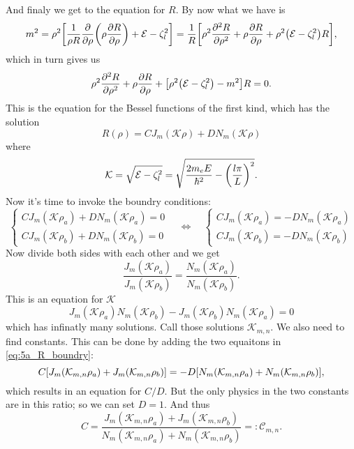 \documentclass[11pt,letter, swedish, english
]{article}
\begin{document}
And finaly we get to the equation for $R$. By now what we have is
\begin{equation}
m^2=\rho^2\qty[\frac{1}{\rho R}\pdv{\rho}
\qty(\rho\pdv{R}{\rho})+\mathcal{E}-\zeta_l^2]
=\frac{1}{R}\qty[\rho^2\pdv[2]{R}{\rho}
+\rho\pdv{R}{\rho}+\rho^2\qty(\mathcal{E}-\zeta_l^2)R],
\end{equation}
which in turn gives us
\begin{equation}\label{eq:5a_Bessel}
\rho^2\pdv[2]{R}{\rho}
+\rho\pdv{R}{\rho}+\qty[\rho^2\qty(\mathcal{E}-\zeta_l^2)-m^2]R=0.
\end{equation}
This is the equation for the Bessel functions of the first kind, which
has the solution
\begin{equation}
R(\rho)=CJ_m(\mathcal{K}\rho)+DN_m(\mathcal{K}\rho)
\end{equation}
where
\begin{equation}\label{eq:5a_kappa}
\mathcal{K}=%
\sqrt{\E-\zeta_l^2}=\sqrt{\frac{2m_eE}{\hbar^2}-\qty(\frac{l\pi}{L})^2}.
\end{equation}
Now it's time to invoke the boundry conditions:
\begin{equation}\label{eq:5a_R_boundry}
\begin{cases}
CJ_m(\mathcal{K}\rho_a)+DN_m(\mathcal{K}\rho_a)=0\\
CJ_m(\mathcal{K}\rho_b)+DN_m(\mathcal{K}\rho_b)=0
\end{cases}
\quad\Longleftrightarrow\quad
\begin{cases}
CJ_m(\mathcal{K}\rho_a)=-DN_m(\mathcal{K}\rho_a)\\
CJ_m(\mathcal{K}\rho_b)=-DN_m(\mathcal{K}\rho_b)
\end{cases}
\end{equation}
Now divide both sides with each other and we get
\begin{equation}
\frac{J_m(\mathcal{K}\rho_a)}{J_m(\mathcal{K}\rho_b)}=
\frac{N_m(\mathcal{K}\rho_a)}{N_m(\mathcal{K}\rho_b)}.
\end{equation}
This is an equation for $\mathcal{K}$
\begin{equation}\label{eq:5a_K}
J_m(\mathcal{K}\rho_a)N_m(\mathcal{K}\rho_b)-J_m(\mathcal{K}\rho_b)N_m(\mathcal{K}\rho_a)=0
\end{equation}
which has infinatly many solutions. Call those solutions
$\mathcal{K}_{m,n}$. We also need to find constants. This can be done
by adding the two equaitons in \eqref{eq:5a_R_boundry}:
\begin{equation}
C\qty[J_m(\mathcal{K}_{m,n}\rho_a)+J_m(\mathcal{K}_{m,n}\rho_b)]
=-D\qty[N_m(\mathcal{K}_{m,n}\rho_a)+N_m(\mathcal{K}_{m,n}\rho_b)],
\end{equation}
which results in an equation for $C/D$. But the only physics in the
two constants are in this ratio; so we can set $D=1$. And thus
\begin{equation}\label{eq:5a_C}
C=
\frac{J_m(\mathcal{K}_{m,n}\rho_a)+J_m(\mathcal{K}_{m,n}\rho_b)}
{N_m(\mathcal{K}_{m,n}\rho_a)+N_m(\mathcal{K}_{m,n}\rho_b)}
=:\mathcal{C}_{m,n}.
\end{equation}
\end{document}
